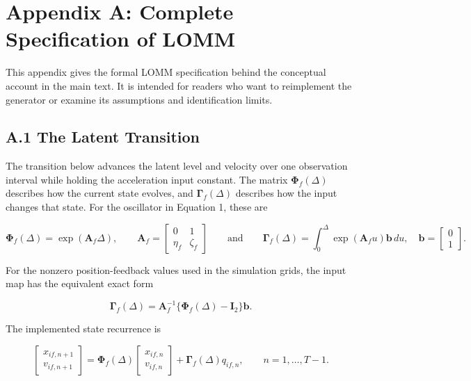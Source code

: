 \documentclass[
]{article}
\begin{document}
\endgroup

\newpage

\setcounter{table}{0}
\renewcommand{\thetable}{A\arabic{table}}
\setcounter{figure}{0}
\renewcommand{\thefigure}{A\arabic{figure}}

\section{Appendix A: Complete Specification of
LOMM}\label{appendix-a-complete-specification-of-lomm}

This appendix gives the formal LOMM specification behind the conceptual
account in the main text. It is intended for readers who want to
reimplement the generator or examine its assumptions and identification
limits.

\subsection{A.1 The Latent Transition}\label{a.1-the-latent-transition}

The transition below advances the latent level and velocity over one
observation interval while holding the acceleration input constant. The
matrix \(\boldsymbol\Phi_f(\Delta)\) describes how the current state
evolves, and \(\boldsymbol\Gamma_f(\Delta)\) describes how the input
changes that state. For the oscillator in Equation 1, these are

\[
\boldsymbol{\Phi}_f(\Delta)=\exp(\mathbf{A}_f\Delta),
\qquad
\mathbf{A}_f=
\begin{bmatrix}
0 & 1 \\
\eta_f & \zeta_f
\end{bmatrix}
\qquad
\text{and}
\qquad
\boldsymbol{\Gamma}_f(\Delta)=\int_0^{\Delta}\exp(\mathbf{A}_f u)\mathbf{b}\,du,
\quad
\mathbf{b}=
\begin{bmatrix}
0 \\
1
\end{bmatrix}.
\]

For the nonzero position-feedback values used in the simulation grids,
the input map has the equivalent exact form

\[
\boldsymbol{\Gamma}_f(\Delta)
=\mathbf{A}_f^{-1}\{\boldsymbol{\Phi}_f(\Delta)-\mathbf{I}_2\}\mathbf{b}.
\]

The implemented state recurrence is

\[
\begin{bmatrix}
x_{if,n+1}\\
v_{if,n+1}
\end{bmatrix}
=
\boldsymbol{\Phi}_f(\Delta)
\begin{bmatrix}
x_{if,n}\\
v_{if,n}
\end{bmatrix}
+
\boldsymbol{\Gamma}_f(\Delta)q_{if,n},
\qquad n=1,\ldots,T-1.
\]
\end{document}
